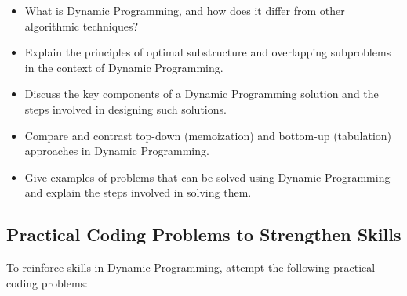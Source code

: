 \documentclass[12pt]{book} %
\begin{document}
\begin{itemize}
    \item What is Dynamic Programming, and how does it differ from other algorithmic techniques?
    \item Explain the principles of optimal substructure and overlapping subproblems in the context of Dynamic Programming.
    \item Discuss the key components of a Dynamic Programming solution and the steps involved in designing such solutions.
    \item Compare and contrast top-down (memoization) and bottom-up (tabulation) approaches in Dynamic Programming.
    \item Give examples of problems that can be solved using Dynamic Programming and explain the steps involved in solving them.
\end{itemize}

\subsection{Practical Coding Problems to Strengthen Skills}
To reinforce skills in Dynamic Programming, attempt the following practical coding problems:
\end{document}
